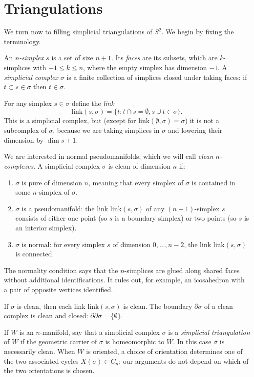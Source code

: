 \documentclass[12pt]{article}
\def\del{\partial}
\newcommand{\kw}{\mathrm}
\newcommand{\link}{\kw{link}}
\begin{document}
\section{Triangulations}

We turn now to filling simplicial triangulations of $S^2$.
We begin by fixing the terminology.

An \emph{$n$-simplex} $s$ is a set of size $n+1$.
Its \emph{faces} are its subsets,
which are $k$-simplices with $-1 \leq k \leq n$,
where the empty simplex has dimension $-1$.
A \emph{simplicial complex} $\sigma$ is a finite collection of simplices
closed under taking faces:
if $t \subset s \in \sigma$ then $t \in \sigma$.

For any simplex $s \in \sigma$ define the \emph{link}
\[
\link(s,\sigma) = \{t: t \cap s = \emptyset, s \cup t \in \sigma \}
.
\]
This is a simplicial complex, but
(except for $\link(\emptyset,\sigma)=\sigma$)
it is not a subcomplex of $\sigma$,
because we are taking simplices in $\sigma$ and lowering
their dimension by $\dim s+1$.

We are interested in normal pseudomanifolds,
which we will call \emph{clean $n$-complexes}.
A simplicial complex $\sigma$ is clean of dimension $n$ if:
\begin{enumerate}
\item
$\sigma$ is pure of dimension $n$,
meaning that every simplex of $\sigma$ is contained in some
$n$-simplex of $\sigma$.

\item
$\sigma$ is a pseudomanifold:
the link $\link(s,\sigma)$ of any $(n-1)$-simplex $s$
consists of either one point
(so $s$ is a boundary simplex)
or two points
(so $s$ is an interior simplex).

\item
$\sigma$ is normal:
for every simplex $s$ of dimension $0,\ldots,n-2$,
the link $\link(s,\sigma)$ is connected.
\end{enumerate}
The normality condition says that the $n$-simplices are glued along
shared faces without additional identifications.  It rules out,
for example, an icosahedron with a pair of opposite vertices identified.

If $\sigma$ is clean, then each link $\link(s,\sigma)$ is clean.
The boundary $\del \sigma$ of a clean complex is clean and closed:
$\del \del \sigma = \{\emptyset\}$.

If $W$ is an $n$-manifold, say that a simplicial complex $\sigma$
is a \emph{simplicial triangulation} of $W$
if the geometric carrier of $\sigma$ is homeomorphic to $W$.
In this case $\sigma$ is necessarily clean.
When $W$ is oriented, a choice of orientation determines one of the
two associated cycles $X(\sigma) \in C_n$; our arguments do not depend
on which of the two orientations is chosen.
\end{document}
